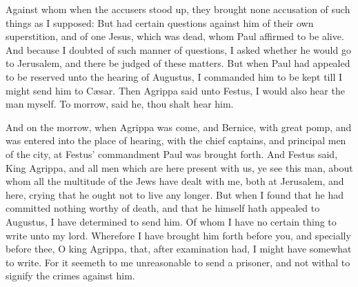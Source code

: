 {Against
whom when the
accusers stood
up, they
brought
none
accusation of such
things as
I
supposed:
But
had
certain
questions
against
him
of their
own
superstition,
and
of
one
Jesus, which was
dead,
whom
Paul
affirmed to be
alive.
And
because
I
doubted
of
such
manner of
questions, I
asked
{}
whether he
would
go
to
Jerusalem, and
there be
judged
of these
matters.
But when
Paul had
appealed to be
reserved
unto the
hearing of
Augustus, I
commanded
him to be
kept
till I might
send
him
to
Cæsar.
Then
Agrippa
said
unto
Festus, I
would
also
hear the
man
myself. To
morrow, said
he, thou shalt
hear
him.
\par }{\PP {}And on the
morrow, when
Agrippa was
come,
and
Bernice,
with
great
pomp,
and was
entered
into the place of
hearing,
with the chief
captains,
and
principal
men of the
city,
at
Festus’
commandment
Paul was brought
forth.
And
Festus
said,
King
Agrippa,
and all
men
which are here
present with
us, ye
see
this
man,
about
whom
all the
multitude of the
Jews have
dealt with
me,
both
at
Jerusalem,
and
{}
here, crying
that
he
ought
not to
live any
longer.
But when
I
found that
he had
committed
nothing
worthy of
death,
and that
he
himself hath appealed
to
Augustus, I have
determined to
send
him.
Of
whom I
have
no
certain
thing to
write unto my
lord.
Wherefore I have
brought
him
forth
before
you,
and
specially
before
thee, O
king
Agrippa,
that, after
examination
had, I might
have
somewhat to
write.
For it
seemeth to
me
unreasonable to
send a
prisoner,
and
not withal to
signify the
crimes
{}
against
him.

}
